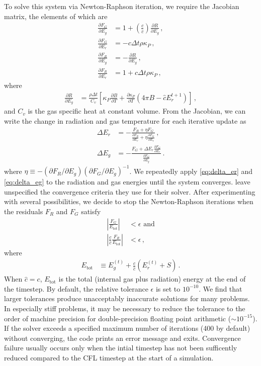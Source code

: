 \documentclass[fleqn,usenatbib]{mnras}
\begin{document}
To solve this system via Newton-Raphson iteration, we require the Jacobian matrix, the elements of which are
\begin{align}
\frac{\partial F_G}{\partial E_g} &= 1 + \left( \frac{c}{\hat c} \right) \frac{\partial R}{\partial E_g} \, , \\
\frac{\partial F_G}{\partial E_r} &= -c \Delta t \rho \kappa_P \, , \\
\frac{\partial F_R}{\partial E_g} &= -\frac{\partial R}{\partial E_g} \, , \\
\frac{\partial F_R}{\partial E_r} &= 1 + \hat c \Delta t \rho \kappa_P \, ,
\end{align}
where
\begin{align}
\frac{\partial R}{\partial E_g} &= \frac{\rho \Delta t}{C_v} \left[ \kappa_P \frac{\partial B}{\partial T} + \frac{\partial \kappa_P}{\partial T} \left( 4\pi B - \hat c E_r^{t+1} \right) \right] \, ,
\end{align}
and $C_v$ is the gas specific heat at constant volume. From the Jacobian, we can write the change in radiation and gas temperature for each iterative update as
\begin{align}
\label{eq:delta_er}
\Delta E_r &= -\frac{F_R + \eta F_G}{ \frac{\partial F_R}{\partial E_r} + \eta \frac{\partial F_G}{\partial E_r} } \, , \\ 
\label{eq:delta_eg}
\Delta E_g &= -\frac{F_G + \Delta E_r \frac{\partial F_G}{\partial E_r}}{ \frac{\partial F_G}{\partial E_g} } \, .
\end{align}
where $\eta \equiv - (\partial F_R/\partial E_g) ( \partial F_G/\partial E_g )^{-1}$. We repeatedly apply \autoref{eq:delta_er} and \autoref{eq:delta_eg} to the radiation and gas energies until the system converges. \citet{Howell_2003} leave unspecified the convergence criteria they use for their solver. After experimenting with several possibilities, we decide to stop the Newton-Raphson iterations when the residuals $F_R$ and $F_G$ satisfy
\begin{align}
\left| \frac{F_G}{E_{\text{tot}}} \right| &< \epsilon \, \, \text{and} \\
\left| \frac{c}{\hat c} \frac{F_R}{E_{\text{tot}}} \right| &< \epsilon \, ,
\end{align}
where
\begin{align}
E_{\text{tot}} &\equiv E_g^{(t)} + \frac{c}{\hat c} \left( E_r^{(t)} + S \right) \, .
\end{align}
When $\hat c = c$, $E_{\text{tot}}$ is the total (internal gas plus radiation) energy at the end of the timestep. By default, the relative tolerance $\epsilon$ is set to $10^{-10}$. We find that larger tolerances produce unacceptably inaccurate solutions for many problems. In especially stiff problems, it may be necessary to reduce the tolerance to the order of machine precision for double-precision floating point arithmetic ($\sim 10^{-15}$). If the solver exceeds a specified maximum number of iterations (400 by default) without converging, the code prints an error message and exits. Convergence failure usually occurs only when the intial timestep has not been sufficently reduced compared to the CFL timestep at the start of a simulation.
\end{document}
